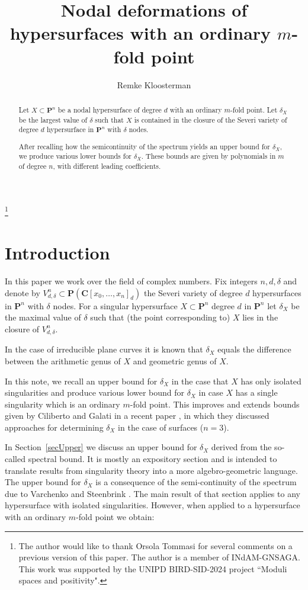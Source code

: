 \documentclass{amsart}
\title{Nodal deformations of hypersurfaces with an ordinary $m$-fold point}
\author{Remke Kloosterman}
\newcommand{\Ps}{\mathbf{P}}
\newcommand{\C}{\mathbf{C}}
\theoremstyle{definition}
\theoremstyle{remark}
\begin{document}
\begin{abstract}
Let $X\subset \Ps^n$ be a nodal hypersurface of degree $d$ with an ordinary $m$-fold point. Let $\delta_X$ be the largest value of $\delta$ such that $X$ is contained in the closure of the Severi variety of degree $d$ hypersurface in  $\Ps^n$ with $\delta$ nodes.

After recalling how the semicontinuity of the spectrum yields an upper  bound for $\delta_X$,  we produce various lower bounds for $\delta_X$.
These bounds are given by polynomials in $m$ of degree $n$,  with different leading coefficients.
\end{abstract}

\thanks{The author would like to thank Orsola Tommasi %
for several comments on a previous version of this paper.
The author is a member  of INdAM-GNSAGA. This work was supported  by the UNIPD BIRD-SID-2024 
project ``Moduli spaces and positivity".}

\maketitle
\section{Introduction}

In this paper we work over the field of complex numbers.
Fix integers $n,d,\delta$ and denote by $V^n_{d,\delta}\subset \Ps(\C[x_0,\dots,x_n]_d)$ the Severi variety of degree $d$ hypersurfaces in  $\Ps^n$ with $\delta$ nodes. For a singular hypersurface $X\subset \Ps^n$  degree $d$ in $\Ps^n$ let $\delta_X$ be the maximal value of $\delta$ such that (the point corresponding to) $X$ lies in the closure of $V^n_{d,\delta}$.

In the case of irreducible plane curves it is known that $\delta_X$ equals the difference between the arithmetic genus of $X$ and geometric genus of $X$.

In this note, we recall an upper bound for $\delta_X$ in the case that $X$ has only isolated singularities and produce various lower bound for $\delta_X$ in case $X$ has a single singularity which is an ordinary $m$-fold point. 
This improves and extends bounds given by  Ciliberto and Galati  in a recent  paper \cite{CiGa26}, in which they discussed approaches for determining $\delta_X$ in the case of surfaces ($n=3$).

In Section~\ref{secUpper} we discuss an upper bound for $\delta_X$ derived from the so-called spectral bound. 
It is mostly an expository section and is intended to translate results from singularity theory into a more algebro-geometric language.
The upper bound for $\delta_X$ is  a consequence of the semi-continuity of the spectrum due to Varchenko \cite{VarSC} and Steenbrink \cite{SteSC}. 
The main result of that section applies to any hypersurface with isolated singularities. However, when applied to a hypersurface with an ordinary $m$-fold point we obtain:
\end{document}
